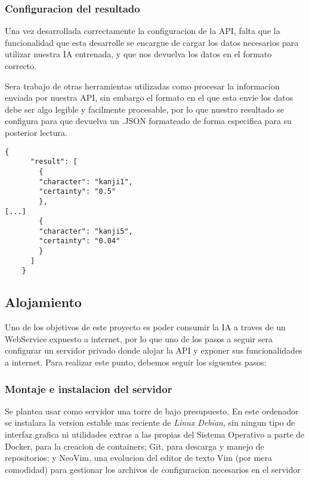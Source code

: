 \documentclass{article}
\begin{document}
\subsubsection{Configuracion del resultado}
Una vez desarrollada correctamente la configuracion de la API, falta que la funcionalidad que esta desarrolle se encargue de cargar los datos necesarios para utilizar nuestra IA entrenada, y que nos devuelva los datos en el formato correcto.

Sera trabajo de otras herramientas utilizadas como procesar la informacion enviada por nuestra API, sin embargo el formato en el que esta envie los datos debe ser algo legible y facilmente procesable, por lo que nuestro resultado se configura para que devuelva un .JSON formateado de forma especifica para su posterior lectura.

\noindent\begin{minipage}{\textwidth}
\begin{lstlisting}[title=Formato del JSON de respuesta., numbers=none]
    {
      "result": [
        {
        "character": "kanji1",
        "certainty": "0.5"
        },
[...]
        {
        "character": "kanji5",
        "certainty": "0.04"
        }
      ]
    }
\end{lstlisting}
\end{minipage}

\subsection{Alojamiento}
Uno de los objetivos de este proyecto es poder consumir la IA a traves de un WebService expuesto a internet, por lo que uno de los pasos a seguir sera configurar un servidor privado donde alojar la API y exponer sus funcionalidades a internet. Para realizar este punto, debemos seguir los siguentes pasos:

\subsubsection{Montaje e instalacion del servidor}
Se plantea usar como servidor una torre de bajo presupuesto. En este ordenador se instalara la version estable mas reciente de \textit{Linux Debian}\rep, sin ningun tipo de interfaz grafica ni utilidades extras a las propias del Sistema Operativo a parte de Docker, para la creacion de containers; Git, para descarga y manejo de repositorios; y NeoVim, una evolucion del editor de texto Vim (por mera comodidad) para gestionar los archivos de configuracion necesarios en el servidor
\end{document}
